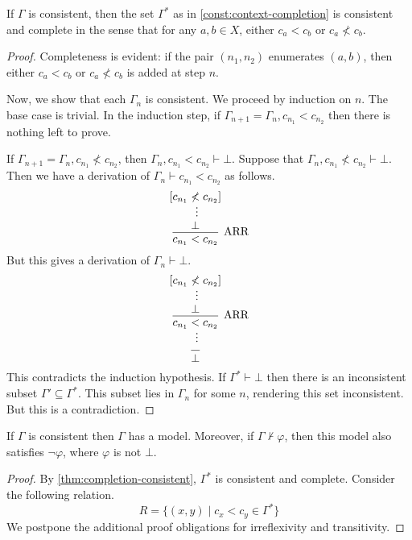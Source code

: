 \documentclass[a4paper]{article}
\begin{document}
\begin{enumerate}
  \begin{lemma}\label{thm:completion-consistent}
    If $\Gamma$ is consistent, then the set $\Gamma^*$ as in \cref{const:context-completion} is consistent and complete in the sense that for any $a,b \in X$, either $c_{a} < c_{b}$ or $c_{a} \nless c_{b}$.
  \end{lemma}
  \begin{proof}
    Completeness is evident: if the pair $(n_1, n_2)$ enumerates $(a,b)$, then either $c_a < c_b$ or $c_a \nless c_b$ is added at step $n$.

    Now, we show that each $\Gamma_{n}$ is consistent.
    We proceed by induction on $n$.
    The base case is trivial.
    In the induction step, if $\Gamma_{n+1} = \Gamma_{n},c_{n_1} < c_{n_2}$ then there is nothing left to prove.

    If $\Gamma_{n+1} = \Gamma_{n},c_{n_1} \nless c_{n_2}$, then $\Gamma_{n},c_{n_1} < c_{n_2} \vdash \bot$.
    Suppose that $\Gamma_{n},c_{n_1} \nless c_{n_2} \vdash \bot$.
    Then we have a derivation of $\Gamma_{n} \vdash c_{n_1} < c_{n_2}$ as follows.
    \[
      \begin{prooftree}
        \hypo{[c_{n_1} \nless c_{n_2}]}
        \ellipsis{}{\bot}
        \infer1[ARR]{c_{n_1} < c_{n_2}}
      \end{prooftree}
    \]
    But this gives a derivation of $\Gamma_{n} \vdash \bot$.
    \[
      \begin{prooftree}
        \hypo{[c_{n_1} \nless c_{n_2}]}
        \ellipsis{}{\bot}
        \infer1[ARR]{c_{n_1} < c_{n_2}}
        \ellipsis{}{}
        \infer1{\bot}
      \end{prooftree}
    \]
    This contradicts the induction hypothesis.
    If $\Gamma^* \vdash \bot$ then there is an inconsistent subset $\Gamma' \subseteq \Gamma^*$.
    This subset lies in $\Gamma_{n}$ for some $n$, rendering this set inconsistent.
    But this is a contradiction.
  \end{proof}
  
  \begin{lemma}\label{thm:model-existence}
    If $\Gamma$ is consistent then $\Gamma$ has a model.
    Moreover, if $\Gamma \nvdash \varphi$, then this model also satisfies $\lnot\varphi$, where $\varphi$ is not $\bot$.
  \end{lemma}
  \begin{proof}
    By \cref{thm:completion-consistent}, $\Gamma^*$ is consistent and complete.
    Consider the following relation.
    \[
      R = \{(x,y) \mid c_{x} < c_{y} \in \Gamma^{*}\}
    \]
    We postpone the additional proof obligations for irreflexivity and transitivity.


\end{proof}
\end{enumerate}
\end{document}
